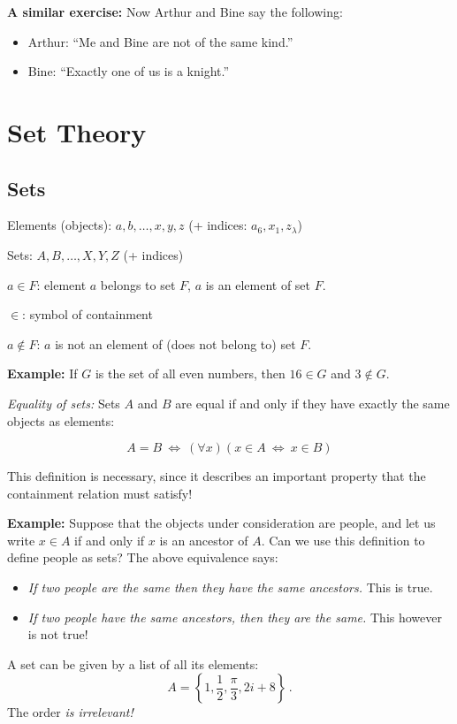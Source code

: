 \documentclass[11pt,paper=b5,footinclude,headinclude]{scrbook} %
\def\cee {{~\Leftrightarrow~}}
\theoremstyle{remark}
\theoremstyle{definition} %
\theoremstyle{theorem} %
\begin{document}
\textbf{ A similar exercise:}
Now Arthur and Bine say the following:
\begin{itemize}
 \item Arthur: ``Me and Bine are not of the same kind.''
 \item Bine: ``Exactly one of us is a knight.''
\end{itemize}
\chapter{Set Theory}

\section{Sets}

Elements (objects): $a,b,\ldots, x,y,z$ (+ indices: $a_6, x_1, z_\lambda$)

Sets: $A,B,\ldots, X,Y,Z$ (+ indices)

$a\in F$: element $a$ belongs to set $F$, $a$ is an element of set $F$.

$\in$: symbol of containment

$a\not\in F$: $a$ is not an element of (does not belong to) set $F$.

\textbf{ Example:}
If $G$ is the set of all even numbers, then $16\in G$ and $3\not\in G$.


\medskip
{\em Equality of sets:} Sets $A$ and $B$ are equal if and only if they have exactly the same objects as elements:

$$A = B \cee (\forall x) (x\in A\cee x\in B)$$

\medskip
This definition is necessary, since it describes an important property that the containment relation must satisfy!

\medskip

\textbf{ Example:} Suppose that the objects under consideration are people, and
let us write $x\in A$ if and only if $x$ is an ancestor of  $A$.
Can we use this definition to define people as sets?
The above equivalence says:
\begin{itemize}
  \item {\em If two people are the same then they have the same ancestors.} This is true.
  \item {\em If two people have the same ancestors, then they are the same.} This however is not true!
\end{itemize}

\bigskip
A set can be given by a list of all its elements:
$$A = \left\{1,\frac{1}{2}, \frac{\pi}{3}, 2i+8\right\}\,.$$
The order {\em is irrelevant!}
\end{document}
